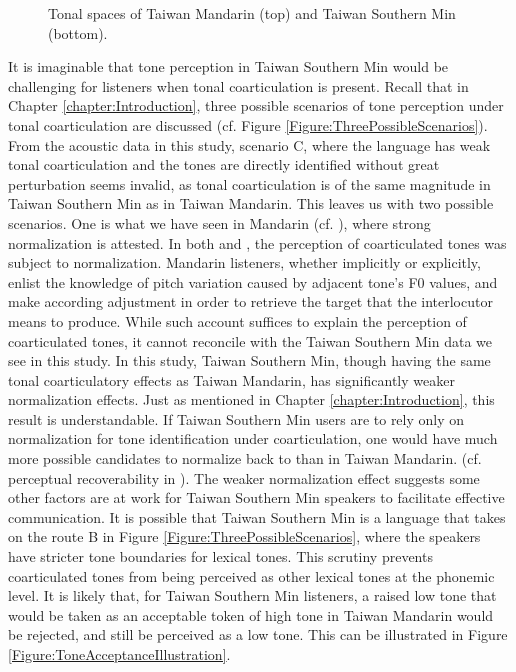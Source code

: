 \documentclass[12pt]{report}
\begin{document}
\begin{CJK}{UTF8}{bsmi}
\begin{figure}[hbt!]
\caption{Tonal spaces of Taiwan Mandarin (top) and Taiwan Southern Min (bottom).}
\label{Figure:ToneSpace}
\end{figure}
It is imaginable that tone perception in Taiwan Southern Min would be challenging for listeners when tonal coarticulation is present. Recall that in Chapter \ref{chapter:Introduction}, three possible scenarios of tone perception under tonal coarticulation are discussed (cf. Figure \ref{Figure:ThreePossibleScenarios}). From the acoustic data in this study, scenario C, where the language has weak tonal coarticulation and the tones are directly identified without great perturbation seems invalid, as tonal coarticulation is of the same magnitude in Taiwan Southern Min as in Taiwan Mandarin. This leaves us with two possible scenarios. One is what we have seen in Mandarin (cf. \citealp{Zhangetal2022}), where strong normalization is attested. In both \cite{Xu1994} and \citeauthor{Zhangetal2022}, the perception of coarticulated tones was subject to normalization. Mandarin listeners, whether implicitly or explicitly, enlist the knowledge of pitch variation caused by adjacent tone's F0 values, and make according adjustment in order to retrieve the target that the interlocutor means to produce. While such account suffices to explain the perception of coarticulated tones, it cannot reconcile with the Taiwan Southern Min data we see in this study. In this study, Taiwan Southern Min, though having the same tonal coarticulatory effects as Taiwan Mandarin, has significantly weaker normalization effects. Just as mentioned in Chapter \ref{chapter:Introduction}, this result is understandable. If Taiwan Southern Min users are to rely only on normalization for tone identification under coarticulation, one would have much more possible candidates to normalize back to than in Taiwan Mandarin. (cf. perceptual recoverability in \citealp{Flemming2011}). The weaker normalization effect suggests some other factors are at work for Taiwan Southern Min speakers to facilitate effective communication. It is possible that Taiwan Southern Min is a language that takes on the route B in Figure \ref{Figure:ThreePossibleScenarios}, where the speakers have stricter tone boundaries for lexical tones. This scrutiny prevents coarticulated tones from being perceived as other lexical tones at the phonemic level. It is likely that, for Taiwan Southern Min listeners, a raised low tone that would be taken as an acceptable token of high tone in Taiwan Mandarin would be rejected, and still be perceived as a low tone. This can be illustrated in Figure \ref{Figure:ToneAcceptanceIllustration}. 

\end{CJK}
\end{document}
